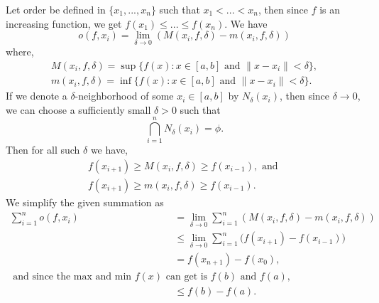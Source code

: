 \begin{questions}

\begin{solution}
  Let order be defined in $\{x_1, . . . ,x_n\}$ such that $x_1<...<x_n$, then since $f$ is an increasing function, we get $f(x_1)\le...\le f(x_n)$. We have
    $$o(f,x_i)=\lim_{\delta\to 0}{(M(x_i,f,\delta)-m(x_i,f,\delta) )}$$
    where,
    $$\begin{array}{cc}
        M(x_i,f,\delta) = \sup {\{f(x):x\in [a,b] \text{ and } \|x-x_i\|<\delta}\},\\
        m(x_i,f,\delta) = \inf {\{f(x):x\in [a,b] \text{ and } \|x-x_i\|<\delta}\}.
    \end{array}$$
    If we denote a $\delta$-neighborhood of some $x_i\in [a,b]$ by $N_{\delta}(x_i)$, then since $\delta\to 0$, we can choose a sufficiently small $\delta>0$ such that
    $$\bigcap_{i=1}^{n}{N_{\delta}(x_i)}=\phi.$$ Then for all such $\delta$ we have, 
    $$\begin{array}{cc}
     f(x_{i+1})\ge M(x_i,f,\delta)\ge f(x_{i-1}),\text{ and }\\
     f(x_{i+1})\ge m(x_i,f,\delta)\ge f(x_{i-1}).
    \end{array}$$
    We simplify the given summation as
    \begin{align*}
        \sum_{i=1}^{n}{o(f,x_i)}&=\lim_{\delta\to 0}{\sum_{i=1}^{n}{(M(x_i,f,\delta)-m(x_i,f,\delta))}}\\
        & \le \lim_{\delta \to 0}\sum_{i=1}^{n}{(f(x_{i+1}) - f(x_{i-1})})\\
        & = f(x_{n+1})-f(x_{0}),\\
        \text{ and since the max and min } f(x) \text{ can get is $f(b)$ and $f(a)$,}\\
        & \le f(b)-f(a).
    \end{align*}
    \qedsymbol
\end{solution}
\end{questions}